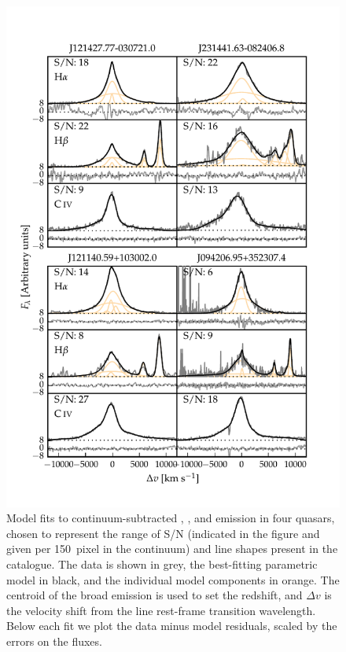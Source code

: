 \begin{figure}
    \centering
    \includegraphics[width=\linewidth]{figures/chapter03/example_spectrum_grid.pdf} 
    \caption[{Model fits to continuum-subtracted \hans, \hbns, and  emission in four quasars, chosen to represent the range of S/N and line shapes present in the catalogue.}]{Model fits to continuum-subtracted \hans, \hbns, and  emission in four quasars, chosen to represent the range of S/N (indicated in the figure and given per 150\kms\, pixel in the continuum) and line shapes present in the catalogue. The data is shown in grey, the best-fitting parametric model in black, and the individual model components in orange. The centroid of the broad \ha emission is used to set the redshift, and $\Delta{v}$ is the velocity shift from the line rest-frame transition wavelength. Below each fit we plot the data minus model residuals, scaled by the errors on the fluxes.} 
    \label{fig:examplegrid}
\end{figure}


